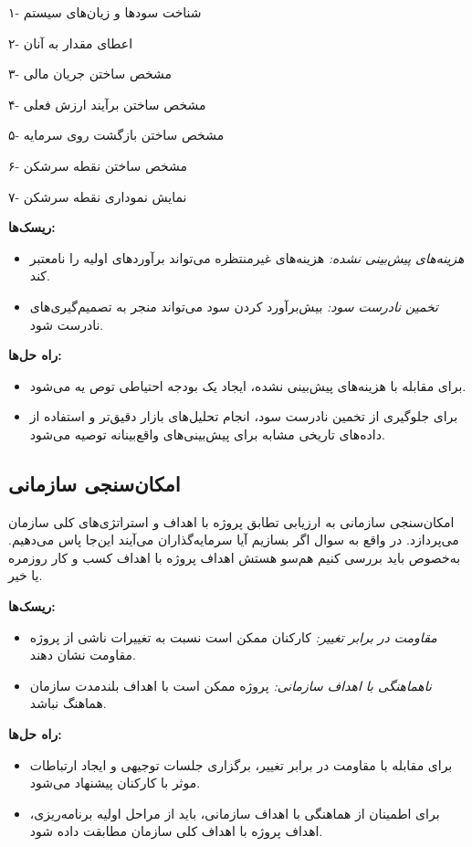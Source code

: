 ۱- شناخت سودها و زیان‌های سیستم

۲- اعطای مقدار به آنان

۳- مشخص ساختن جریان مالی

۴- مشخص ساختن برآیند ارزش فعلی

۵- مشخص ساختن بازگشت روی سرمایه

۶- مشخص ساختن نقطه سرشکن

۷- نمایش نموداری نقطه سرشکن
\newpage

\textbf{ریسک‌ها:}
\begin{itemize}
	\item \textit{هزینه‌های پیش‌بینی نشده:} هزینه‌های غیرمنتظره می‌تواند برآوردهای اولیه را نامعتبر کند.
	\item \textit{تخمین نادرست سود:} بیش‌برآورد کردن سود می‌تواند منجر به تصمیم‌گیری‌های نادرست شود.
\end{itemize}

\textbf{راه حل‌ها:}
\begin{itemize}
	\item برای مقابله با هزینه‌های پیش‌بینی نشده، ایجاد یک بودجه احتیاطی توص
	یه می‌شود.
	\item برای جلوگیری از تخمین نادرست سود، انجام تحلیل‌های بازار دقیق‌تر و استفاده از داده‌های تاریخی مشابه برای پیش‌بینی‌های واقع‌بینانه توصیه می‌شود.
\end{itemize}

\subsection{امکان‌سنجی سازمانی}
امکان‌سنجی سازمانی به ارزیابی تطابق پروژه با اهداف و استراتژی‌های کلی سازمان می‌پردازد. در واقع به سوال اگر بسازیم آیا سرمایه‌گذاران می‌آیند این‌جا پاس می‌دهیم. به‌خصوص باید بررسی کنیم هم‌سو هستش اهداف پروژه با اهداف کسب و کار روزمره یا خیر.

\textbf{ریسک‌ها:}
\begin{itemize}
\item \textit{مقاومت در برابر تغییر:} کارکنان ممکن است نسبت به تغییرات ناشی از پروژه مقاومت نشان دهند.
\item \textit{ناهماهنگی با اهداف سازمانی:} پروژه ممکن است با اهداف بلندمدت سازمان هماهنگ نباشد.
\end{itemize}

\textbf{راه حل‌ها:}
\begin{itemize}
\item برای مقابله با مقاومت در برابر تغییر، برگزاری جلسات توجیهی و ایجاد ارتباطات موثر با کارکنان پیشنهاد می‌شود.
\item برای اطمینان از هماهنگی با اهداف سازمانی، باید از مراحل اولیه برنامه‌ریزی، اهداف پروژه با اهداف کلی سازمان مطابقت داده شود.
\end{itemize}

